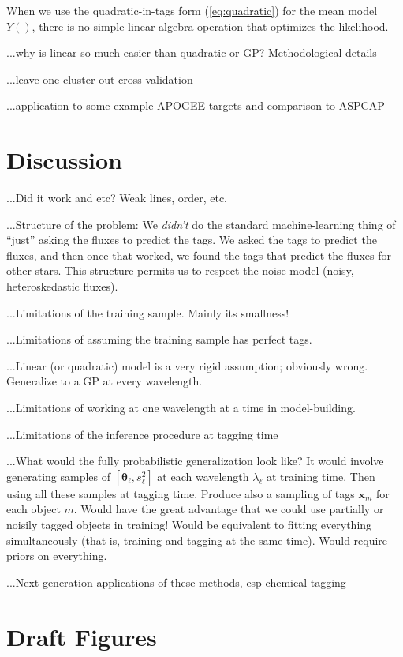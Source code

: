 \documentclass[12pt, preprint]{aastex}
\newcommand{\set}[1]{\bm{#1}}
\begin{document}
When we use the quadratic-in-tags form (\ref{eq:quadratic}) for the
mean model $Y()$, there is no simple linear-algebra operation that
optimizes the likelihood.



...why is linear so much easier than quadratic or GP?  Methodological details

...leave-one-cluster-out cross-validation

...application to some example APOGEE targets and comparison to ASPCAP

\section{Discussion}

...Did it work and etc?  Weak lines, order, etc.

...Structure of the problem:
We \emph{didn't} do the standard machine-learning thing of ``just'' asking the fluxes to predict the tags.
We asked the tags to predict the fluxes, and then once that worked, we found the tags that predict the fluxes for other stars.
This structure permits us to respect the noise model (noisy, heteroskedastic fluxes).

...Limitations of the training sample.  Mainly its smallness!

...Limitations of assuming the training sample has perfect tags.

...Linear (or quadratic) model is a very rigid assumption; obviously wrong.
Generalize to a GP at every wavelength.

...Limitations of working at one wavelength at a time in model-building.

...Limitations of the inference procedure at tagging time

...What would the fully probabilistic generalization look like?
It would involve generating samples of $[\set{\theta}_\ell, s_\ell^2]$ at each wavelength $\lambda_\ell$ at training time.
Then using all these samples at tagging time.
Produce also a sampling of tags $\set{x}_m$ for each object $m$.
Would have the great advantage that we could use partially or noisily tagged objects in training!
Would be equivalent to fitting everything simultaneously (that is, training and tagging at the same time).
Would require priors on everything.

...Next-generation applications of these methods, esp chemical tagging

\section{Draft Figures}
\end{document}
